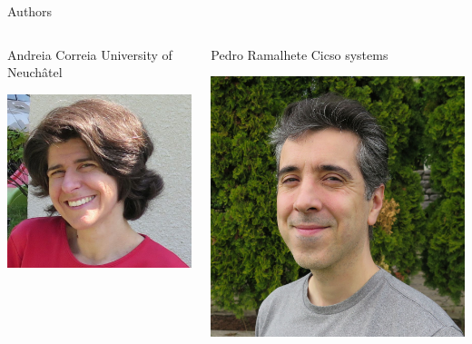\documentclass[presentation]{beamer}
\begin{document}
\begin{frame}[label={sec:orgadbd897}]{Authors}
\begin{block}{}
\begin{columns}
\begin{column}{0.2\columnwidth}
\begin{block}{Andreia Correia}
University of Neuchâtel\\
\begin{center}
\includegraphics[width=.9\linewidth]{./IMGs/andreia.jpg}
\end{center}
\end{block}
\end{column}
\begin{column}{0.2\columnwidth}
\begin{block}{Pedro Ramalhete}
Cicso systems\\
\begin{center}
\includegraphics[width=.9\linewidth]{./IMGs/pedro.jpg}
\end{center}
\end{block}
\end{column}
\end{columns}
\end{block}


\end{frame}
\end{document}
